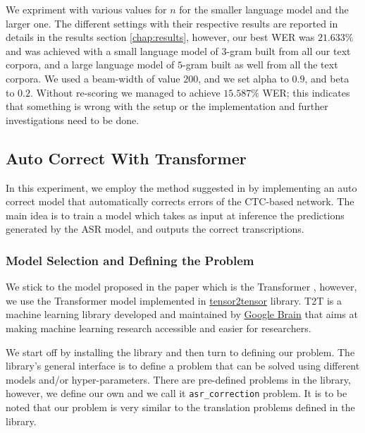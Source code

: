 We expriment with various values for $n$ for the smaller language model and the larger one. The different settings with their respective results are reported in details in the results section \ref{chap:results}, however, our best \ac{WER} was $21.633\%$ and was achieved with a small language model of $3$-gram built from all our text corpora, and a large language model of $5$-gram built as well from all the text corpora. We used a beam-width of value $200$, and we set alpha to $0.9$, and beta to $0.2$. Without re-scoring we managed to achieve $15.587\%$ \ac{WER}; this indicates that something is wrong with the setup or the implementation and further investigations need to be done.


\subsection{Auto Correct With Transformer}
\label{meth:s4_sub7}

In this experiment, we employ the method suggested in \cite{zhang2019automatic} by implementing an auto correct model that automatically corrects errors of the \ac{CTC}-based network. The main idea is to train a model which takes as input at inference the predictions generated by the \ac{ASR} model, and outputs the correct transcriptions. 

\subsubsection{Model Selection and Defining the Problem}
\label{meth:s4_sub7_subsub1}

We stick to the model proposed in the paper \cite{zhang2019automatic} which is the Transformer \cite{vaswani2017attention}, however, we use the Transformer model implemented in \href{https://github.com/tensorflow/tensor2tensor}{tensor2tensor} library. \ac{T2T} is a machine learning library developed and maintained by \href{https://ai.google/research/teams/brain}{Google Brain} that aims at making machine learning research accessible and easier for researchers.


We start off by installing the library and then turn to defining our problem. The library's general interface is to define a problem that can be solved using different models and/or hyper-parameters. There are pre-defined problems in the library, however, we define our own and we call it \texttt{asr\_correction} problem. It is to be noted that our problem is very similar to the translation problems defined in the library. 

